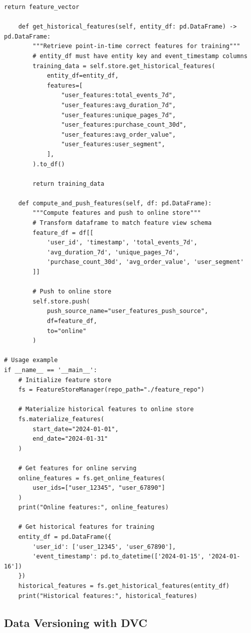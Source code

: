 \begin{lstlisting}[style=python, caption=Feature store implementation with Feast]
        return feature_vector

    def get_historical_features(self, entity_df: pd.DataFrame) -> pd.DataFrame:
        """Retrieve point-in-time correct features for training"""
        # entity_df must have entity key and event_timestamp columns
        training_data = self.store.get_historical_features(
            entity_df=entity_df,
            features=[
                "user_features:total_events_7d",
                "user_features:avg_duration_7d",
                "user_features:unique_pages_7d",
                "user_features:purchase_count_30d",
                "user_features:avg_order_value",
                "user_features:user_segment",
            ],
        ).to_df()

        return training_data

    def compute_and_push_features(self, df: pd.DataFrame):
        """Compute features and push to online store"""
        # Transform dataframe to match feature view schema
        feature_df = df[[
            'user_id', 'timestamp', 'total_events_7d',
            'avg_duration_7d', 'unique_pages_7d',
            'purchase_count_30d', 'avg_order_value', 'user_segment'
        ]]

        # Push to online store
        self.store.push(
            push_source_name="user_features_push_source",
            df=feature_df,
            to="online"
        )

# Usage example
if __name__ == '__main__':
    # Initialize feature store
    fs = FeatureStoreManager(repo_path="./feature_repo")

    # Materialize historical features to online store
    fs.materialize_features(
        start_date="2024-01-01",
        end_date="2024-01-31"
    )

    # Get features for online serving
    online_features = fs.get_online_features(
        user_ids=["user_12345", "user_67890"]
    )
    print("Online features:", online_features)

    # Get historical features for training
    entity_df = pd.DataFrame({
        'user_id': ['user_12345', 'user_67890'],
        'event_timestamp': pd.to_datetime(['2024-01-15', '2024-01-16'])
    })
    historical_features = fs.get_historical_features(entity_df)
    print("Historical features:", historical_features)
\end{lstlisting}

\subsection{Data Versioning with DVC}

